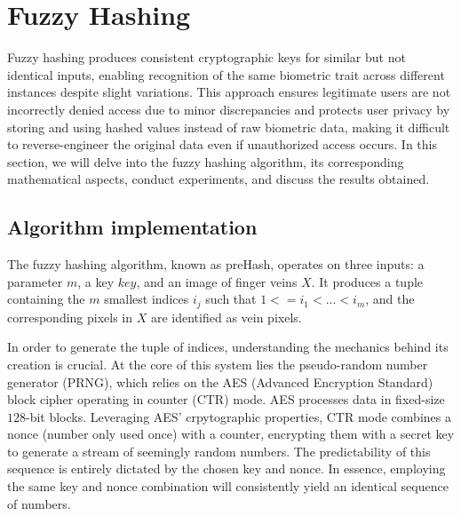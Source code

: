 \section{Fuzzy Hashing}
\label{sec:Fuzzy Hashing}
Fuzzy hashing produces consistent cryptographic keys for similar but not identical inputs, enabling recognition of the same biometric trait across different instances despite slight variations. This approach ensures legitimate users are not incorrectly denied access due to minor discrepancies and protects user privacy by storing and using hashed values instead of raw biometric data, making it difficult to reverse-engineer the original data even if unauthorized access occurs. 
In this section, we will delve into the fuzzy hashing algorithm, its corresponding mathematical aspects, conduct experiments, and discuss the results obtained.
\subsection{Algorithm implementation}


The fuzzy hashing algorithm, known as preHash, operates on three inputs: a parameter $m$, a key $key$, and an image of finger veins $X$. It produces a tuple containing the $m$ smallest indices $i_j$ such that $1 <= i_1 < ... < i_m$, and the corresponding pixels in $X$ are identified as vein pixels.

In order to generate the tuple of indices, understanding the mechanics behind its creation is crucial. At the core of this system lies the pseudo-random number generator (PRNG), which relies on the AES (Advanced Encryption Standard) block cipher operating in counter (CTR) mode. AES processes data in fixed-size $128$-bit blocks. Leveraging AES' crpytographic properties, CTR mode combines a nonce (number only used once) with a counter, encrypting them with a secret key to generate a stream of seemingly random numbers. 
The predictability of this sequence is entirely dictated by the chosen key and nonce. In essence, employing the same key and nonce combination will consistently yield an identical sequence of numbers. 

